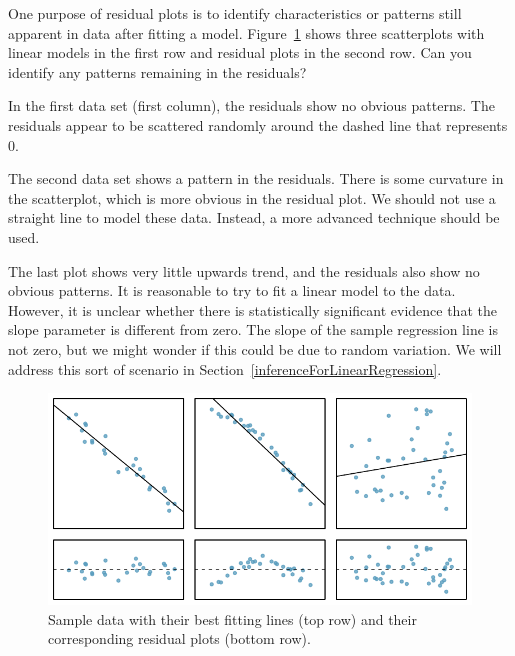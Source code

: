 \begin{examplewrap}
\begin{nexample}{One purpose of residual plots is to identify characteristics or patterns still apparent in data after fitting a model. Figure~\ref{sampleLinesAndResPlots} shows three scatterplots with linear models in the first row and residual plots in the second row. Can you identify any patterns remaining in the residuals?}


In the first data set (first column), the residuals show no obvious patterns. The residuals appear to be scattered randomly around the dashed line that represents 0.

The second data set shows a pattern in the residuals. There is some curvature in the scatterplot, which is more obvious in the residual plot. We should not use a straight line to model these data. Instead, a more advanced technique should be used.

The last plot shows very little upwards trend, and the residuals also show no obvious patterns. It is reasonable to try to fit a linear model to the data. However, it is unclear whether there is statistically significant evidence that the slope parameter is different from zero. The slope of the sample regression line is not zero, but we might wonder if this could be due to random variation. We will address this sort of scenario in Section~\ref{inferenceForLinearRegression}.
\end{nexample}
\end{examplewrap}

\begin{figure}[h]
   \centering
   \includegraphics[width=\textwidth]{ch_regr_simple_linear/figures/sampleLinesAndResPlots/sampleLinesAndResPlots}
   \caption{Sample data with their best fitting lines (top row) and their corresponding residual plots (bottom row).}
   \label{sampleLinesAndResPlots}
\end{figure}



